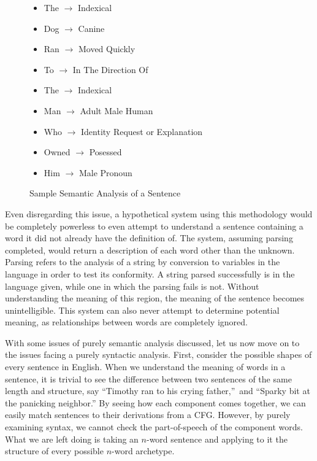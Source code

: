 \begin{center}
\begin{figure}[H]
\begin{center}

\begin{itemize}

	\item The $\rightarrow$ Indexical 
	\item Dog $\rightarrow$ Canine
	\item Ran $\rightarrow$ Moved Quickly
	\item To $\rightarrow$ In The Direction Of
	\item The $\rightarrow$ Indexical
	\item Man $\rightarrow$ Adult Male Human
	\item Who $\rightarrow$ Identity Request or Explanation
	\item Owned $\rightarrow$ Posessed
	\item Him $\rightarrow$ Male Pronoun

\end{itemize}
\end{center}
\caption{Sample Semantic Analysis of a Sentence}
\end{figure}
\end{center}

Even disregarding this issue, a hypothetical system using this methodology would be completely powerless to even attempt to understand a sentence containing a word it did not already have the definition of. The system, assuming parsing completed, would return a description of each word other than the unknown. Parsing refers to the analysis of a string by conversion to variables in the language in order to test its conformity. A string parsed successfully is in the language given, while one in which the parsing fails is not. Without understanding the meaning of this region, the meaning of the sentence becomes unintelligible. This system can also never attempt to determine potential meaning, as relationships between words are completely ignored.

With some issues of purely semantic analysis discussed, let us now move on to the issues facing a purely syntactic analysis. First, consider the possible shapes of every sentence in English. When we understand the meaning of words in a sentence, it is trivial to see the difference between two sentences of the same length and structure, say ``Timothy ran to his crying father,''\ and ``Sparky bit at the panicking neighbor.'' By seeing how each component comes together, we can easily match sentences to their derivations from a CFG. However, by purely examining syntax, we cannot check the part-of-speech of the component words. What we are left doing is taking an $n$-word sentence and applying to it the structure of every possible $n$-word archetype.

